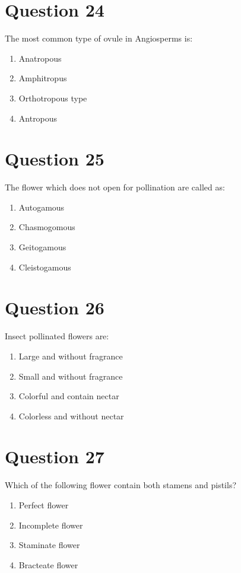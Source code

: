 \documentclass{article}
\begin{document}
\section*{Question 24}
The most common type of ovule in Angiosperms is:
\begin{enumerate}[label=(\alph*)]
\item Anatropous
\item Amphitropus
\item Orthotropous type
\item Antropous
\end{enumerate}
\newpage
\section*{Question 25}
The flower which does not open for pollination are called as:
\begin{enumerate}[label=(\alph*)]
\item Autogamous
\item Chasmogomous
\item Geitogamous
\item Cleistogamous
\end{enumerate}
\newpage
\section*{Question 26}
Insect pollinated flowers are:
\begin{enumerate}[label=(\alph*)]
\item Large and without fragrance
\item Small and without fragrance
\item Colorful and contain nectar
\item Colorless and without nectar
\end{enumerate}
\newpage
\section*{Question 27}
Which of the following flower contain both stamens and pistils?
\begin{enumerate}[label=(\alph*)]
\item Perfect flower
\item Incomplete flower
\item Staminate flower
\item Bracteate flower
\end{enumerate}
\newpage
\end{document}
